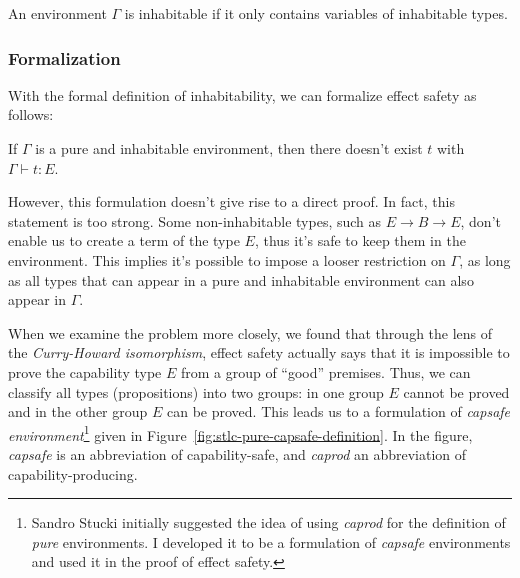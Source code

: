 \begin{definition}
  An environment $\Gamma$ is inhabitable if it only contains variables
  of inhabitable types.
\end{definition}

\subsubsection{Formalization}

With the formal definition of inhabitability, we can formalize effect
safety as follows:

\begin{definition}
  If $\Gamma$ is a pure and inhabitable environment, then there
  doesn't exist $t$ with $\Gamma \vdash t : E$.
\end{definition}

However, this formulation doesn't give rise to a direct proof. In
fact, this statement is too strong. Some non-inhabitable types, such
as $E \to B \to E$, don't enable us to create a term of the type $E$,
thus it's safe to keep them in the environment. This implies it's
possible to impose a looser restriction on $\Gamma$, as long as all
types that can appear in a pure and inhabitable environment can also
appear in $\Gamma$.

When we examine the problem more closely, we found that through the
lens of the \emph{Curry-Howard isomorphism}, effect safety actually
says that it is impossible to prove the capability type $E$ from a
group of ``good'' premises. Thus, we can classify all types
(propositions) into two groups: in one group $E$ cannot be proved and
in the other group $E$ can be proved. This leads us to a formulation
of \emph{capsafe environment}\footnote{Sandro Stucki initially
  suggested the idea of using \emph{caprod} for the definition of
  \emph{pure} environments. I developed it to be a formulation of
  \emph{capsafe} environments and used it in the proof of effect
  safety.} given in Figure~\ref{fig:stlc-pure-capsafe-definition}. In
the figure, \emph{capsafe} is an abbreviation of capability-safe, and
\emph{caprod} an abbreviation of capability-producing.


